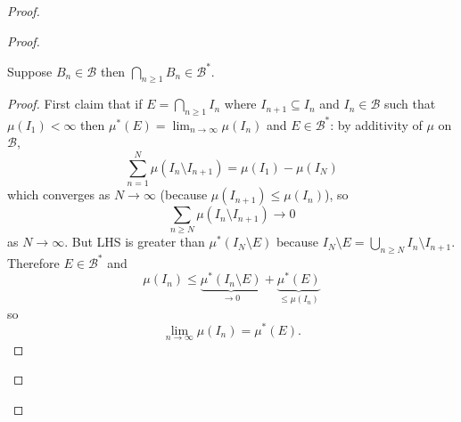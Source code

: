 \documentclass[a4paper]{article}
\begin{document}
\begin{proof}
\begin{proof}
\begin{enumerate}
      \begin{lemma}
        Suppose \(B_n \in \mathcal B\) then \(\bigcap_{n \geq 1} B_n \in \mathcal B^*\).
      \end{lemma}

      \begin{proof}
        First claim that if \(E = \bigcap_{n \geq 1} I_n\) where \(I_{n + 1} \subseteq I_n\) and \(I_n \in \mathcal B\) such that \(\mu(I_1) < \infty\) then \(\mu^*(E) = \lim_{n \to \infty} \mu(I_n)\) and \(E \in \mathcal B^*\): by additivity of \(\mu\) on \(\mathcal B\),
        \[
          \sum_{n = 1}^N \mu(I_n \setminus I_{n + 1})
          = \mu(I_1) - \mu(I_N)
        \]
        which converges as \(N \to \infty\) (because \(\mu(I_{n + 1}) \leq \mu(I_n)\)), so
        \[
          \sum_{n \geq N} \mu(I_n \setminus I_{n + 1}) \to 0
        \]
        as \(N \to \infty\). But LHS is greater than \(\mu^*(I_N \setminus E)\) because \(I_N \setminus E = \bigcup_{n \geq N} I_n \setminus I_{n + 1}\). Therefore \(E \in \mathcal B^*\) and
          \[
            \mu(I_n) \leq \underbrace{\mu^*(I_n \setminus E)}_{\to 0} + \underbrace{\mu^*(E)}_{\leq \mu(I_n)}
          \]
          so
          \[
            \lim_{n \to \infty} \mu(I_n) = \mu^*(E).
          \]


\end{proof}
\end{enumerate}
\end{proof}
\end{proof}
\end{document}
